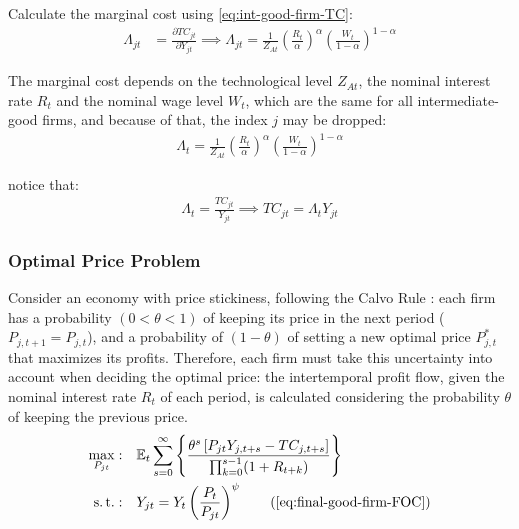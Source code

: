 \documentclass[
thesis.tex
]{subfiles}
\begin{document}
	
	Calculate the marginal cost using \ref{eq:int-good-firm-TC}: 
	\begin{align}
		\label{eq:int-good-firm-MC}
		\Lambda_{jt} & = \frac{\partial TC_{jt}}{\partial Y_{jt}}
		\implies 
		\Lambda_{jt} = \frac{1}{Z_{At}} \left( \frac{R_t}{\alpha} \right)^{\alpha} \left( \frac{W_t}{1-\alpha} \right)^{1-\alpha}
	\end{align}
	
	The marginal cost depends on the technological level $Z_{At}$, the nominal interest rate $R_t$ and the nominal wage level $W_t$, which are the same for all intermediate-good firms, and because of that, the index $j$ may be dropped:
	\begin{align}
		\label{eq:int-good-firm-MC-2}
		\Lambda_t = \frac{1}{Z_{At}} \left( \frac{R_t}{\alpha} \right)^{\alpha} \left( \frac{W_t}{1-\alpha} \right)^{1-\alpha}
	\end{align}
	
	notice that:
	\begin{align}
		\label{eq:int-good-firm-TC-MC}
		\Lambda_t = \frac{TC_{jt}}{Y_{jt}} \implies 
		TC_{jt} = \Lambda_t Y_{jt}
	\end{align}
	
	
	\subsubsection*{Optimal Price Problem}
	
	Consider an economy with price stickiness, following the Calvo Rule \cite{calvo_staggered_1983}: each firm has a probability $(0 < \theta < 1)$ of keeping its price in the next period ($P_{j,t+1} = P_{j,t}$), and a probability of $(1 - \theta)$ of setting a new optimal price $P_{j,t}^\ast$ that maximizes its profits. Therefore, each firm must take this uncertainty into account when deciding the optimal price: the intertemporal profit flow, given the nominal interest rate $R_t$ of each period, is calculated considering the probability $\theta$ of keeping the previous price.
	\begin{align}
		\max_{P_{jt}}: & \quad \E \sum_{s=0}^{\infty} \left\{ \frac{ \theta^s \left[ P_{jt} Y_{j,t+s} - TC_{j,t+s} \right] }{\prod_{k=0}^{s-1}(1+R_{t+k})} \right\} \label{eq:int-good-firm-optimal-price-problem} \\
		\st: & \quad Y_{jt} = Y_t \left( \frac{P_t}{P_{jt}} \right)^{\psi} \tag{\ref{eq:final-good-firm-FOC}}
	\end{align}
	
\end{document}
